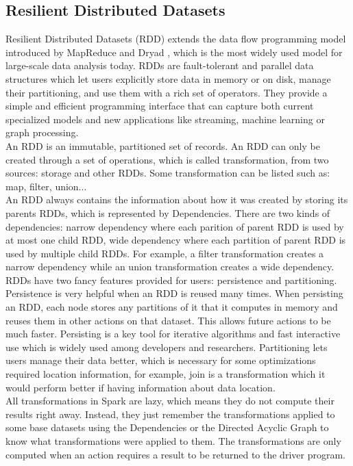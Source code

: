 \subsection{Resilient Distributed Datasets}
Resilient Distributed Datasets (RDD) extends the data flow programming model introduced by MapReduce \cite{Dean2004} and Dryad \cite{michael2007}, which is the most widely used model for large-scale data analysis today. RDDs are fault-tolerant and parallel data structures which let users explicitly store data in memory or on disk, manage their partitioning, and use them with a rich set of operators. They provide a simple and efficient programming interface that can capture both current specialized models and new applications like streaming, machine learning or graph processing.\\

An RDD is an immutable, partitioned set of records. An RDD can only be created through a set of operations, which is called transformation, from two sources: storage and other RDDs. Some transformation can be listed such as: map, filter, union...\\
An RDD always contains the information about how it was created by storing its parents RDDs, which is represented by Dependencies. There are two kinds of dependencies: narrow dependency where each parition of parent RDD is used by at most one child RDD, wide dependency where each partition of parent RDD is used by multiple child RDDs. For example, a filter transformation creates a narrow dependency while an union transformation creates a wide dependency.\\
RDDs have two fancy features provided for users: persistence and partitioning. Persistence is very helpful when an RDD is reused many times. When persisting an RDD, each node stores any partitions of it that it computes in memory and reuses them in other actions on that dataset. This allows future actions to be much faster. Persisting is a key tool for iterative algorithms and fast interactive use which is widely used among developers and researchers. Partitioning lets users manage their data better, which is necessary for some optimizations required location information, for example, join is a transformation which it would perform better if having information about data location.\\

All transformations in Spark are lazy, which means they do not compute their results right away. Instead, they just remember the transformations applied to some base datasets using the Dependencies or the Directed Acyclic Graph to know what transformations were applied to them. The transformations are only computed when an action requires a result to be returned to the driver program.\\

